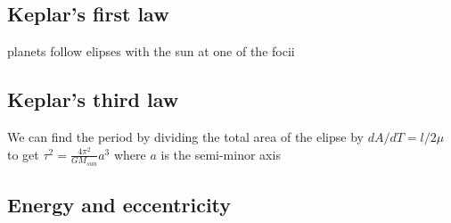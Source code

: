 \documentclass{homework}
\begin{document}
\subsection{Keplar's first law}
planets follow elipses with the sun at one of the focii



\subsection{Keplar's third law}

We can find the period by dividing the total area of the elipse by $dA/dT = l/2\mu$ to get $\tau^2= \frac{4\pi^2}{GM_{sun}}a^3$ where $a$ is the semi-minor axis

\subsection{Energy and eccentricity}
\end{document}
